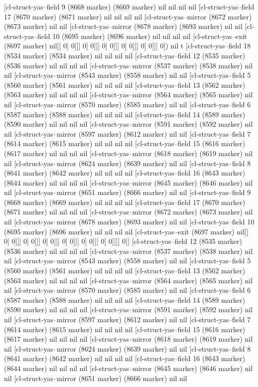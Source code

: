 {{[cl-struct-yas--field 9 (8668 marker) (8669 marker) nil nil nil nil [cl-struct-yas--field 17 (8670 marker) (8671 marker) nil nil nil nil [cl-struct-yas--mirror (8672 marker) (8673 marker) nil nil [cl-struct-yas--mirror (8678 marker) (8693 marker) nil nil [cl-struct-yas--field 10 (8695 marker) (8696 marker) nil nil nil nil [cl-struct-yas--exit (8697 marker) nil]] 0] 0]]] 0] 0]]] 0] 0]]] 0] 0]]] 0] 0]]] 0]) nil t [cl-struct-yas--field 18 (8534 marker) (8534 marker) nil nil nil nil [cl-struct-yas--field 12 (8535 marker) (8536 marker) nil nil nil nil [cl-struct-yas--mirror (8537 marker) (8538 marker) nil nil [cl-struct-yas--mirror (8543 marker) (8558 marker) nil nil [cl-struct-yas--field 5 (8560 marker) (8561 marker) nil nil nil nil [cl-struct-yas--field 13 (8562 marker) (8563 marker) nil nil nil nil [cl-struct-yas--mirror (8564 marker) (8565 marker) nil nil [cl-struct-yas--mirror (8570 marker) (8585 marker) nil nil [cl-struct-yas--field 6 (8587 marker) (8588 marker) nil nil nil nil [cl-struct-yas--field 14 (8589 marker) (8590 marker) nil nil nil nil [cl-struct-yas--mirror (8591 marker) (8592 marker) nil nil [cl-struct-yas--mirror (8597 marker) (8612 marker) nil nil [cl-struct-yas--field 7 (8614 marker) (8615 marker) nil nil nil nil [cl-struct-yas--field 15 (8616 marker) (8617 marker) nil nil nil nil [cl-struct-yas--mirror (8618 marker) (8619 marker) nil nil [cl-struct-yas--mirror (8624 marker) (8639 marker) nil nil [cl-struct-yas--field 8 (8641 marker) (8642 marker) nil nil nil nil [cl-struct-yas--field 16 (8643 marker) (8644 marker) nil nil nil nil [cl-struct-yas--mirror (8645 marker) (8646 marker) nil nil [cl-struct-yas--mirror (8651 marker) (8666 marker) nil nil [cl-struct-yas--field 9 (8668 marker) (8669 marker) nil nil nil nil [cl-struct-yas--field 17 (8670 marker) (8671 marker) nil nil nil nil [cl-struct-yas--mirror (8672 marker) (8673 marker) nil nil [cl-struct-yas--mirror (8678 marker) (8693 marker) nil nil [cl-struct-yas--field 10 (8695 marker) (8696 marker) nil nil nil nil [cl-struct-yas--exit (8697 marker) nil]] 0] 0]]] 0] 0]]] 0] 0]]] 0] 0]]] 0] 0]]] 0] 0]]]] 0]] [cl-struct-yas--field 12 (8535 marker) (8536 marker) nil nil nil nil [cl-struct-yas--mirror (8537 marker) (8538 marker) nil nil [cl-struct-yas--mirror (8543 marker) (8558 marker) nil nil [cl-struct-yas--field 5 (8560 marker) (8561 marker) nil nil nil nil [cl-struct-yas--field 13 (8562 marker) (8563 marker) nil nil nil nil [cl-struct-yas--mirror (8564 marker) (8565 marker) nil nil [cl-struct-yas--mirror (8570 marker) (8585 marker) nil nil [cl-struct-yas--field 6 (8587 marker) (8588 marker) nil nil nil nil [cl-struct-yas--field 14 (8589 marker) (8590 marker) nil nil nil nil [cl-struct-yas--mirror (8591 marker) (8592 marker) nil nil [cl-struct-yas--mirror (8597 marker) (8612 marker) nil nil [cl-struct-yas--field 7 (8614 marker) (8615 marker) nil nil nil nil [cl-struct-yas--field 15 (8616 marker) (8617 marker) nil nil nil nil [cl-struct-yas--mirror (8618 marker) (8619 marker) nil nil [cl-struct-yas--mirror (8624 marker) (8639 marker) nil nil [cl-struct-yas--field 8 (8641 marker) (8642 marker) nil nil nil nil [cl-struct-yas--field 16 (8643 marker) (8644 marker) nil nil nil nil [cl-struct-yas--mirror (8645 marker) (8646 marker) nil nil [cl-struct-yas--mirror (8651 marker) (8666 marker) nil nil }}
